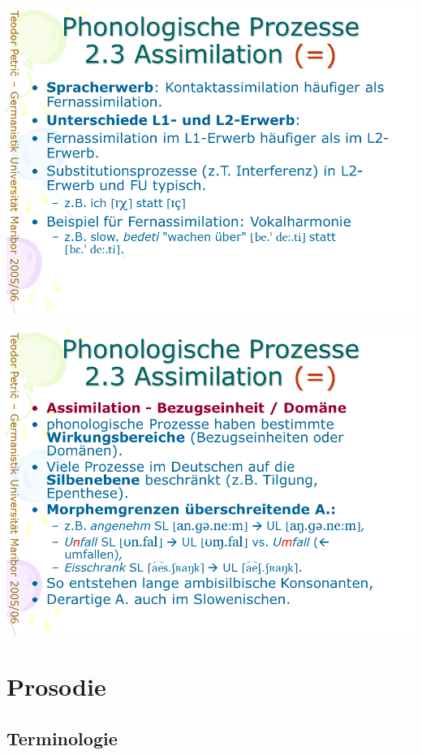 \documentclass[
  letterpaper,
]{scrbook}
\begin{document}
\includegraphics[width=1\textwidth,height=\textheight]{./pictures/prozesse/prozesse_42.PNG}

\includegraphics[width=1\textwidth,height=\textheight]{./pictures/prozesse/prozesse_43.PNG}

\hypertarget{sec-prosodie}{%
\chapter{Prosodie}\label{sec-prosodie}}

\hypertarget{terminologie}{%
\section{Terminologie}\label{terminologie}}
\end{document}

